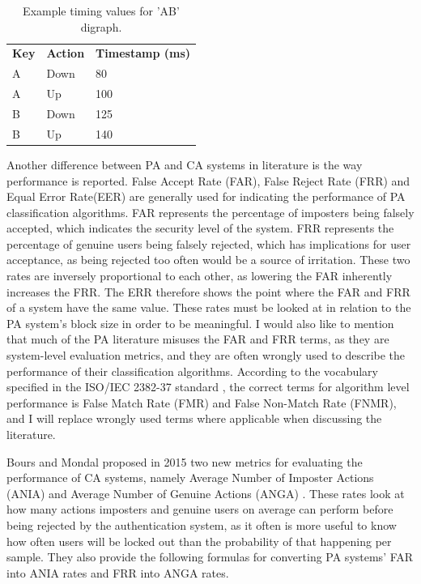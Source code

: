 \documentclass[informationsecurity]{gucmasterproject}
\begin{document}
\begin{table}[h]
    \centering
    \begin{tabular}{lll}
         \bf Key & \bf Action & \bf Timestamp (ms)\\
         A & Down & 80\\
         A & Up & 100\\
         B & Down & 125\\
         B & Up & 140
    \end{tabular}
    \caption{Example timing values for 'AB' digraph.}
    \label{tab:timing-example}
\end{table}

Another difference between PA and CA systems in literature is the way performance is reported.
False Accept Rate (FAR), False Reject Rate (FRR) and Equal Error Rate(EER) are generally used for indicating the performance of PA classification algorithms.
FAR represents the percentage of imposters being falsely accepted, which indicates the security level of the system. 
FRR represents the percentage of genuine users being falsely rejected, which has implications for user acceptance, as being rejected too often would be a source of irritation.
These two rates are inversely proportional to each other, as lowering the FAR inherently increases the FRR.
The ERR therefore shows the point where the FAR and FRR of a system have the same value.
These rates must be looked at in relation to the PA system's block size in order to be meaningful.
I would also like to mention that much of the PA literature misuses the FAR and FRR terms, as they are system-level evaluation metrics, and they are often wrongly used to describe the performance of their classification algorithms.
According to the vocabulary specified in the ISO/IEC 2382-37 standard \cite{ISO-voc}, the correct terms for algorithm level performance is False Match Rate (FMR) and False Non-Match Rate (FNMR), and I will replace wrongly used terms where applicable when discussing the literature.

Bours and Mondal proposed in 2015 two new metrics for evaluating the performance of CA systems, namely Average Number of Imposter Actions (ANIA) and Average Number of Genuine Actions (ANGA) \cite{CA-performance}.
These rates look at how many actions imposters and genuine users on average can perform before being rejected by the authentication system, as it often is more useful to know how often users will be locked out than the probability of that happening per sample.
They also provide the following formulas for converting PA systems' FAR into ANIA rates and FRR into ANGA rates.
\end{document}
